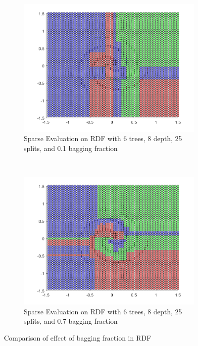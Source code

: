 \documentclass[a4paper, 10pt, conference]{ieeeconf}
\begin{document}
\begin{figure}[!ht]
  \captionsetup[subfigure]{position=b}
  \centering
    \begin{subfigure}{0.45\linewidth}
      \includegraphics[width=\textwidth]{img/tree_params/tree_sparse_6_8_25_1}
      \caption{Sparse Evaluation on RDF with 6 trees, 8 depth, 25 splits, and 0.1 bagging fraction}
      \label{fig:sparse_6_8_25_1}
    \end{subfigure}
    ~
    \begin{subfigure}{0.45\linewidth}
      \includegraphics[width=\textwidth]{img/tree_params/tree_sparse_6_8_25_7}
      \caption{Sparse Evaluation on RDF with 6 trees, 8 depth, 25 splits, and 0.7 bagging fraction}
      \label{fig:sparse_6_8_25_7}
    \end{subfigure}

  \caption{Comparison of effect of bagging fraction in RDF}
  \label{fig:compare_bagging}
\end{figure}
\end{document}
